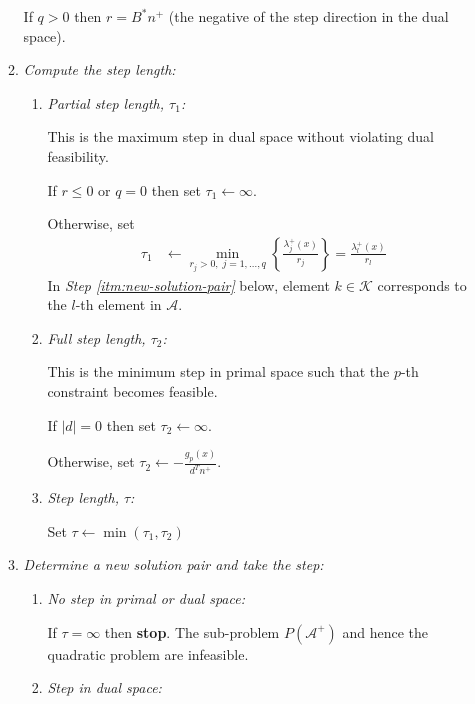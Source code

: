 \documentclass[a4paper,twoside,10pt,english]{report}
\begin{document}
\begin{algorithm}[!htb]
\begin{enumerate}[start=0]
\begin{enumerate}
    If $q>0$ then  $r=B^{*}n^{+}$ (the negative of the step direction in the
    dual space).

    \item \emph{Compute the step length:}
    \begin{enumerate}
      \item \emph{Partial step length, $\tau_{1}$:} 

        This is the maximum step in dual space without violating dual 
        feasibility. 

        If $r\le0$ or $q=0$ then set $\tau_{1}\leftarrow\infty$. 

        Otherwise, set 
        \begin{align*}
          \tau_{1} & \leftarrow \min_{r_{j}>0,\; j=1,\ldots,q}
                     \left\{ \frac{\lambda_{j}^{+}\left(x\right)}{r_{j}}\right\} =
                     \frac{\lambda_{l}^{+}\left(x\right)}{r_{l}}
        \end{align*}
        In \emph{Step \ref{itm:new-solution-pair}} below, element 
        $k\in\mathcal{K}$ corresponds to the $l$-th element in $\mathcal{A}$.

      \item \emph{Full step length, $\tau_{2}$:} 

        This is the minimum step in 
        primal space such that the $p$-th constraint becomes feasible. 

        If $\left|d\right|=0$ then set $\tau_{2}\leftarrow\infty$. 

        Otherwise, set 
        $\tau_{2}\leftarrow-\frac{g_{p}\left(x\right)}{d^{T}n^{+}}$.

      \item \emph{Step length, $\tau$:} 

        Set $\tau\leftarrow\min\left(\tau_{1},\tau_{2}\right)$
    \end{enumerate}
    \item \label{itm:new-solution-pair}\emph{Determine a new solution pair 
        and take the step:}
      \begin{enumerate}
      \item \emph{No step in primal or dual space:} 

        If $\tau=\infty$ then \textbf{stop}. The sub-problem 
        $P\left(\mathcal{A}^{+}\right)$ and hence the quadratic problem are 
        infeasible.

      \item \emph{Step in dual space:} 


\end{enumerate}
\end{enumerate}
\end{enumerate}
\end{algorithm}
\end{document}
